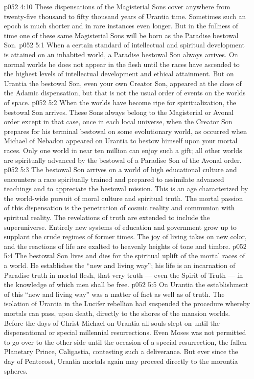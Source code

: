 \vs p052 4:10 \pc These dispensations of the Magisterial Sons cover anywhere from twenty\hyp{}five thousand to fifty thousand years of Urantia time. Sometimes such an epoch is much shorter and in rare instances even longer. But in the fullness of time one of these same Magisterial Sons will be born as the Paradise bestowal Son.
\vs p052 5:1 When a certain standard of intellectual and spiritual development is attained on an inhabited world, a Paradise bestowal Son always arrives. On normal worlds he does not appear in the flesh until the races have ascended to the highest levels of intellectual development and ethical attainment. But on Urantia the bestowal Son, even your own Creator Son, appeared at the close of the Adamic dispensation, but that is not the usual order of events on the worlds of space.
\vs p052 5:2 When the worlds have become ripe for spiritualization, the bestowal Son arrives. These Sons always belong to the Magisterial or Avonal order except in that case, once in each local universe, when the Creator Son prepares for his terminal bestowal on some evolutionary world, as occurred when Michael of Nebadon appeared on Urantia to bestow himself upon your mortal races. Only one world in near ten million can enjoy such a gift; all other worlds are spiritually advanced by the bestowal of a Paradise Son of the Avonal order.
\vs p052 5:3 \pc The bestowal Son arrives on a world of high educational culture and encounters a race spiritually trained and prepared to assimilate advanced teachings and to appreciate the bestowal mission. This is an age characterized by the world\hyp{}wide pursuit of moral culture and spiritual truth. The mortal passion of this dispensation is the penetration of cosmic reality and communion with spiritual reality. The revelations of truth are extended to include the superuniverse. Entirely new systems of education and government grow up to supplant the crude regimes of former times. The joy of living takes on new color, and the reactions of life are exalted to heavenly heights of tone and timbre.
\vs p052 5:4 The bestowal Son lives and dies for the spiritual uplift of the mortal races of a world. He establishes the “new and living way”; his life is an incarnation of Paradise truth in mortal flesh, that very truth --- even the Spirit of Truth --- in the knowledge of which men shall be free.
\vs p052 5:5 On Urantia the establishment of this “new and living way” was a matter of fact as well as of truth. The isolation of Urantia in the Lucifer rebellion had suspended the procedure whereby mortals can pass, upon death, directly to the shores of the mansion worlds. Before the days of Christ Michael on Urantia all souls slept on until the dispensational or special millennial resurrections. Even Moses was not permitted to go over to the other side until the occasion of a special resurrection, the fallen Planetary Prince, Caligastia, contesting such a deliverance. But ever since the day of Pentecost, Urantia mortals again may proceed directly to the morontia spheres.
